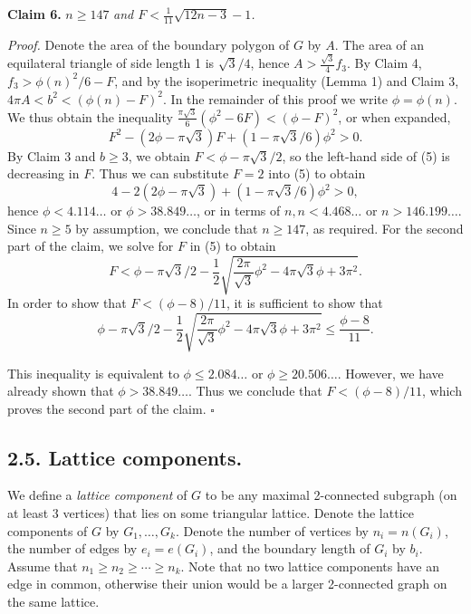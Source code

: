 \documentclass{article}
\begin{document}
\textbf{Claim 6.} $n \ge 147$ \textit{and $F < \frac{1}{11}\sqrt{12n - 3} - 1$.}

\textit{Proof.} Denote the area of the boundary polygon of $G$ by $A$. The area of an equilateral triangle of side length 1 is $\sqrt{3}/4$, hence $A > \frac{\sqrt{3}}{4} f_{3}$. By Claim 4, $f_{3} > \phi(n)^{2}/6 - F$, and by the isoperimetric inequality (Lemma 1) and Claim 3, $4\pi A < b^{2} < (\phi(n) - F)^{2}$. In the remainder of this proof we write $\phi = \phi(n)$. We thus obtain the inequality $\frac{\pi \sqrt{3}}{6} (\phi^{2} - 6F) < (\phi - F)^{2}$, or when expanded, 
\begin{equation*}
F^2 - (2\phi - \pi\sqrt{3})F + (1 - \pi\sqrt{3}/6)\phi^2 > 0. \tag{5}
\end{equation*} By Claim 3 and $b \ge 3$, we obtain $F < \phi - \pi \sqrt{3}/2$, so the left-hand side of (5) is decreasing in $F$. Thus we can substitute $F = 2$ into (5) to obtain 
\begin{equation*}
4 - 2(2\phi - \pi\sqrt{3}) + (1 - \pi\sqrt{3}/6)\phi^2 > 0,
\end{equation*} hence $\phi < 4.114 \ldots$ or $\phi > 38.849 \ldots$, or in terms of $n, n < 4.468 \ldots$ or $n > 146.199 \ldots$. Since $n \ge 5$ by assumption, we conclude that $n \ge 147$, as required. For the second part of the claim, we solve for $F$ in (5) to obtain 
\begin{equation*}
F < \phi - \pi\sqrt{3}/2 - \frac{1}{2}\sqrt{\frac{2\pi}{\sqrt{3}}\phi^2 - 4\pi\sqrt{3}\phi + 3\pi^2}.
\end{equation*} In order to show that $F < (\phi - 8)/11$, it is sufficient to show that 
\begin{equation*}
\phi - \pi\sqrt{3}/2 - \frac{1}{2}\sqrt{\frac{2\pi}{\sqrt{3}}\phi^2 - 4\pi\sqrt{3}\phi + 3\pi^2} \le \frac{\phi - 8}{11}.
\end{equation*}

This inequality is equivalent to $\phi \le 2.084 \ldots$ or $\phi \ge 20.506 \ldots$. However, we have already shown that $\phi > 38.849 \ldots$. Thus we conclude that $F < (\phi - 8)/11$, which proves the second part of the claim. \hfill$\square$

\subsection*{2.5. Lattice components.}

We define a \textit{lattice component} of $G$ to be any maximal 2-connected subgraph (on at least 3 vertices) that lies on some triangular lattice. Denote the lattice components of $G$ by $G_{1}, \ldots, G_{k}$. Denote the number of vertices by $n_{i} = n(G_{i})$, the number of edges by $e_{i} = e(G_{i})$, and the boundary length of $G_{i}$ by $b_{i}$. Assume that $n_{1} \ge n_{2} \ge \cdots \ge n_{k}$. Note that no two lattice components have an edge in common, otherwise their union would be a larger 2-connected graph on the same lattice.
\end{document}
